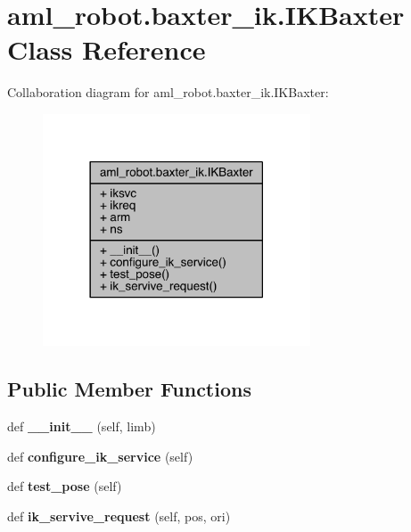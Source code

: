 \hypertarget{classaml__robot_1_1baxter__ik_1_1_i_k_baxter}{}\section{aml\+\_\+robot.\+baxter\+\_\+ik.\+I\+K\+Baxter Class Reference}
\label{classaml__robot_1_1baxter__ik_1_1_i_k_baxter}


Collaboration diagram for aml\+\_\+robot.\+baxter\+\_\+ik.\+I\+K\+Baxter\+:\nopagebreak
\begin{figure}[H]
\begin{center}
\leavevmode
\includegraphics[width=225pt]{classaml__robot_1_1baxter__ik_1_1_i_k_baxter__coll__graph}
\end{center}
\end{figure}
\subsection*{Public Member Functions}
\begin{DoxyCompactItemize}
\item 
\hypertarget{classaml__robot_1_1baxter__ik_1_1_i_k_baxter_a0a3b51131aee6878a699acc52a4ba04a}{}\label{classaml__robot_1_1baxter__ik_1_1_i_k_baxter_a0a3b51131aee6878a699acc52a4ba04a} 
def {\bfseries \+\_\+\+\_\+init\+\_\+\+\_\+} (self, limb)
\item 
\hypertarget{classaml__robot_1_1baxter__ik_1_1_i_k_baxter_aace0b5190c906109c69e6ece73ed0b24}{}\label{classaml__robot_1_1baxter__ik_1_1_i_k_baxter_aace0b5190c906109c69e6ece73ed0b24} 
def {\bfseries configure\+\_\+ik\+\_\+service} (self)
\item 
\hypertarget{classaml__robot_1_1baxter__ik_1_1_i_k_baxter_a4686dc6fa1d6da0c234f8f363b173ef6}{}\label{classaml__robot_1_1baxter__ik_1_1_i_k_baxter_a4686dc6fa1d6da0c234f8f363b173ef6} 
def {\bfseries test\+\_\+pose} (self)
\item 
\hypertarget{classaml__robot_1_1baxter__ik_1_1_i_k_baxter_a70290edec3451fca30cfc38c3569449c}{}\label{classaml__robot_1_1baxter__ik_1_1_i_k_baxter_a70290edec3451fca30cfc38c3569449c} 
def {\bfseries ik\+\_\+servive\+\_\+request} (self, pos, ori)
\end{DoxyCompactItemize}
